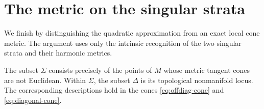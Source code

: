 \section{The metric on the singular strata}\label{sec:strata}

We finish by distinguishing the quadratic approximation
from an exact local cone metric. The argument uses only
the intrinsic recognition of the two singular strata and
their harmonic metrics.

\begin{lemma}\label{lem:intrinsic-strata}
The subset $\Sigma$ consists precisely of the points of
$M$ whose metric tangent cones are not Euclidean. Within
$\Sigma$, the subset $\Delta$ is its topological
nonmanifold locus. The corresponding descriptions hold
in the cones \eqref{eq:offdiag-cone} and
\eqref{eq:diagonal-cone}.
\end{lemma}

